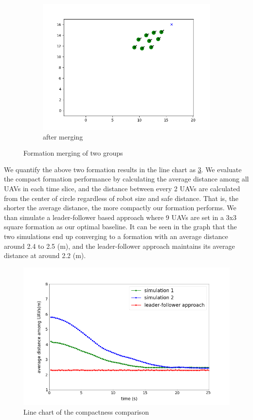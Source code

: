 \begin{figure}[htbp]
\begin{subfigure}[b]{0.3\textwidth}
         \centering
         \includegraphics[width=\textwidth]{figures/merge_3.png}
         \caption{after merging}
         \label{fig:merging_c}
     \end{subfigure}
        \caption{Formation merging of two groups}
        \label{fig:merging}
\end{figure}

We quantify the above two formation results in the line chart as \ref{fig:comparison}. We evaluate the compact formation performance by calculating the average distance among all UAVs in each time slice, and the distance between every 2 UAVs are calculated from the center of circle regardless of robot size and safe distance. That is, the shorter the average distance, the more compactly our formation performs. We than simulate a leader-follower based approach where 9 UAVs are set in a 3x3 square formation as our optimal baseline. It can be seen in the graph that the two simulations end up converging to a formation with an average distance around 2.4 to 2.5 (m), and the leader-follower approach maintains its average distance at around 2.2 (m).

\begin{figure}[H]
    \centering
    \includegraphics[scale=1]{figures/average_distance_comparison.png}
    \caption{Line chart of the compactness comparison}
    \label{fig:comparison}
\end{figure}

